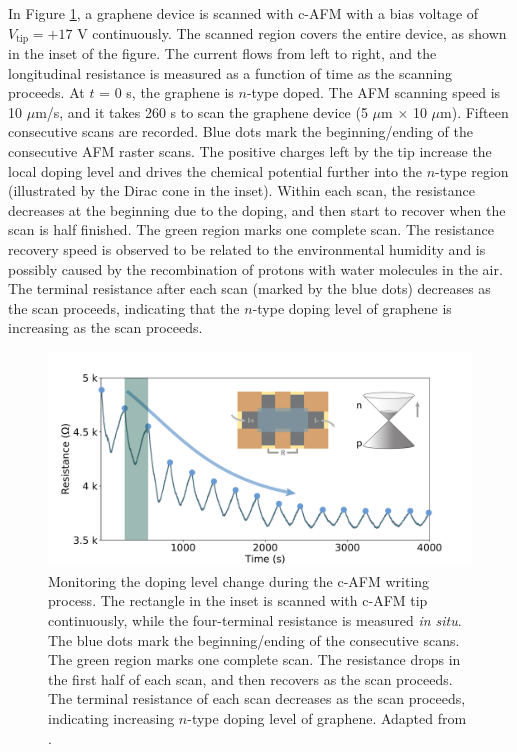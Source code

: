 \documentclass[pdflatex, sectionletters, 12pt, final, phd]{pittetd}    %
\begin{document}
In Figure \ref{FIG:WritingResistance}, a graphene device is scanned with c-AFM with a bias voltage of $V_\mathrm{tip} = +17$ V continuously. The scanned region covers the entire device, as shown in the inset of the figure. The current flows from left to right, and the longitudinal resistance is measured as a function of time as the scanning proceeds. At $t$ = 0 s, the graphene is $n$-type doped. The AFM scanning speed is 10 $\mu$m/s, and it takes 260 s to scan the graphene device (5 $\mu$m $\times$ 10 $\mu$m). Fifteen consecutive scans are recorded. Blue dots mark the beginning/ending of the consecutive AFM raster scans. The positive charges left by the tip increase the local doping level and drives the chemical potential further into the $n$-type region (illustrated by the Dirac cone in the inset). Within each scan, the resistance decreases at the beginning due to the doping, and then start to recover when the scan is half finished. The green region marks one complete scan. The resistance recovery speed is observed to be related to the environmental humidity and is possibly caused by the recombination of protons with water molecules in the air. The terminal resistance after each scan (marked by the blue dots) decreases as the scan proceeds, indicating that the $n$-type doping level of graphene is increasing as the scan proceeds.

\begin{figure}[h!]
	\centering
	\includegraphics[width=1\textwidth]{Drawing/WritingResistance.pdf}
	\caption[Monitoring the doping level change during the c-AFM writing process]{Monitoring the doping level change during the c-AFM writing process. The rectangle in the inset is scanned with c-AFM tip continuously, while the four-terminal resistance is measured \textit{in situ}. The blue dots mark the beginning/ending of the consecutive scans. The green region marks one complete scan. The resistance drops in the first half of each scan, and then recovers as the scan proceeds. The terminal resistance of each scan decreases as the scan proceeds, indicating increasing $n$-type doping level of graphene. Adapted from \cite{li2019reconfigurable}.}
	\label{FIG:WritingResistance}
\end{figure}
\end{document}
